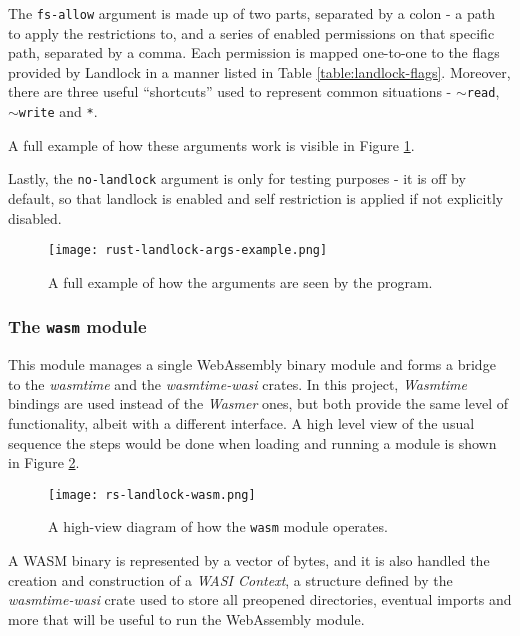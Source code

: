 The \texttt{fs-allow} argument is made up of two parts, separated by a colon - a path to apply the restrictions to,
and a series of enabled permissions on that specific path, separated by a comma.
Each permission is mapped one-to-one to the flags provided by Landlock in a manner listed in Table \ref{table:landlock-flags}.
Moreover, there are three useful ``shortcuts'' used to represent common situations - \texttt{$\sim$read}, \texttt{$\sim$write} and \texttt{*}.

A full example of how these arguments work is visible in Figure \ref{fig:args-example}.

Lastly, the \texttt{no-landlock} argument is only for testing purposes - it is off by default, so that
landlock is enabled and self restriction is applied if not explicitly disabled.

\begin{figure}[h]
  \centering
  \texttt{[image: rust-landlock-args-example.png]}
  \caption{A full example of how the arguments are seen by the program.}
  \label{fig:args-example}
\end{figure}

\subsubsection{The \texttt{wasm} module}

This module manages a single WebAssembly binary module and forms a bridge to the \textit{wasmtime} and the \textit{wasmtime-wasi}
crates. In this project, \textit{Wasmtime} bindings are used instead of the \textit{Wasmer} ones, but both provide the
same level of functionality, albeit with a different interface. A high level view of the usual sequence the steps would be done
when loading and running a module is shown in Figure \ref{fig:wasm-module}.

\begin{figure}[h]
  \centering
  \texttt{[image: rs-landlock-wasm.png]}
  \caption{A high-view diagram of how the \texttt{wasm} module operates.}
  \label{fig:wasm-module}
\end{figure}

A WASM binary is represented by a vector of bytes, and it is also handled the creation
and construction of a \textit{WASI Context}, a structure defined by the \textit{wasmtime-wasi} crate used to store
all preopened directories, eventual imports and more that will be useful to run the WebAssembly module.


